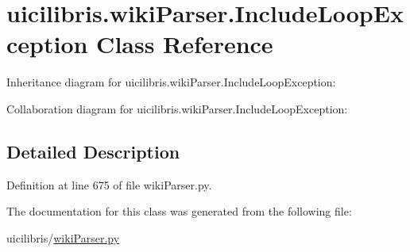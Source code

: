 \hypertarget{classuicilibris_1_1wikiParser_1_1IncludeLoopException}{\section{uicilibris.\-wiki\-Parser.\-Include\-Loop\-Exception \-Class \-Reference}
\label{classuicilibris_1_1wikiParser_1_1IncludeLoopException}
}


\-Inheritance diagram for uicilibris.\-wiki\-Parser.\-Include\-Loop\-Exception\-:


\-Collaboration diagram for uicilibris.\-wiki\-Parser.\-Include\-Loop\-Exception\-:


\subsection{\-Detailed \-Description}


\-Definition at line 675 of file wiki\-Parser.\-py.



\-The documentation for this class was generated from the following file\-:\begin{DoxyCompactItemize}
\item 
uicilibris/\hyperlink{wikiParser_8py}{wiki\-Parser.\-py}\end{DoxyCompactItemize}
